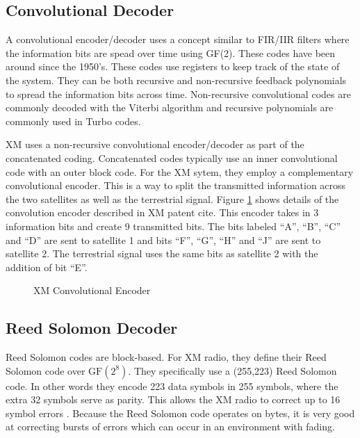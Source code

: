 \documentclass[conference,onecolumn]{IEEEtran}
\begin{document}
\subsection{Convolutional Decoder}

A convolutional encoder/decoder uses a concept similar to FIR/IIR filters where the information bits are spead over time using GF(2).  These codes have been around since the 1950's.  These codes use registers to keep track of the state of the system.  They can be both recursive and non-recursive feedback polynomials to spread the information bits across time.  Non-recursive convolutional codes are commonly decoded with the Viterbi algorithm and recursive polynomials are commonly used in Turbo codes.

XM uses a non-recursive convolutional encoder/decoder as part of the concatenated coding.  Concatenated codes typically use an inner convolutional code with an outer block code.  For the XM sytem, they employ a complementary convolutional encoder.  This is a way to split the transmitted information across the two satellites as well as the terrestrial signal.  Figure \ref{fig::Viterbi} shows details of the convolution encoder described in XM patent {cite}.  This encoder takes in 3 information bits and create 9 transmitted bits.  The bits labeled ``A'', ``B'', ``C'' and ``D'' are sent to satellite 1 and bits ``F'', ``G'', ``H'' and ``J'' are sent to satellite 2.  The terrestrial signal uses the same bits as satellite 2 with the addition of bit ``E''.

\begin{figure}[H]
	\centerline{}
	\caption{XM Convolutional Encoder}
	\label{fig::Viterbi}
\end{figure}

\subsection{Reed Solomon Decoder}

Reed Solomon codes are block-based. For XM radio, they define their Reed Solomon code over $\text{GF}\left(2^8\right)$. They specifically use a (255,223) Reed Solomon code. In other words they encode 223 data symbols in 255 symbols, where the extra 32 symbols serve as parity. This allows the XM radio to correct up to 16 symbol errors \cite{a2008_us8260192b2}. Because the Reed Solomon code operates on bytes, it is very good at correcting bursts of errors which can occur in an environment with fading.
\end{document}
